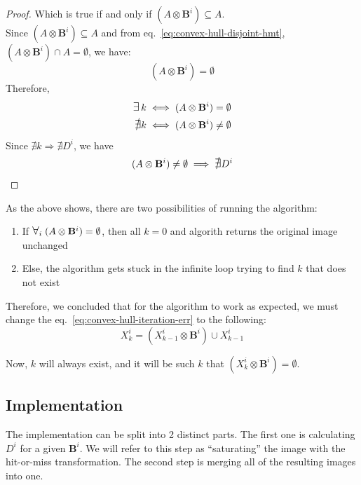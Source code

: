 \documentclass[12pt]{article}
\begin{document}
\begin{proof}
    Which is true if and only if $(A \otimes \mathbf{B}^i) \subseteq A$.\\
    Since $(A \otimes \mathbf{B}^i) \subseteq A$ and from eq.~\eqref{eq:convex-hull-disjoint-hmt}, $(A \otimes \mathbf{B}^i) \cap A = \emptyset$, we have:
    \begin{equation}
        (A \otimes \mathbf{B}^i) = \emptyset
    \end{equation}
    Therefore,
    \begin{align*}
        \bigexists k                              & \iff (A \otimes \mathbf{B}^i) = \emptyset    \\
        \mbox{\large$\mathsurround0pt\nexists$} k & \iff (A \otimes \mathbf{B}^i) \neq \emptyset
    \end{align*}
    Since $\nexists k \Rightarrow \nexists D^i$, we have
    \begin{equation}
        (A \otimes \mathbf{B}^i) \neq \emptyset \implies \mbox{\large$\mathsurround0pt\nexists$} D^i
    \end{equation}
\end{proof}

As the above shows, there are two possibilities of running the algorithm:
\begin{enumerate}
    \item If $\bigforall_i \; (A \otimes \mathbf{B}^i) = \emptyset$, then all $k = 0$ and algorith returns the original image unchanged
    \item Else, the algorithm gets stuck in the infinite loop trying to find $k$ that does not exist
\end{enumerate}

Therefore, we concluded that for the algorithm to work as expected, we must change the eq.~\eqref{eq:convex-hull-iteration-err} to the following:
\begin{equation}
    X^i_k = (X^i_{k-1} \otimes \mathbf{B}^i) \cup X^i_{k-1}
\end{equation}

Now, $k$ will always exist, and it will be such $k$ that $(X^i_k \otimes \mathbf{B}^i) = \emptyset$.

\pagebreak[2]
\subsection{Implementation}
\label{sec:convex-hull-impl}

The implementation can be split into 2 distinct parts.
The first one is calculating $D^i$ for a given $\mathbf{B}^i$.
We will refer to this step as ``saturating'' the image with the hit-or-miss transformation.
The second step is merging all of the resulting images into one.
\end{document}
